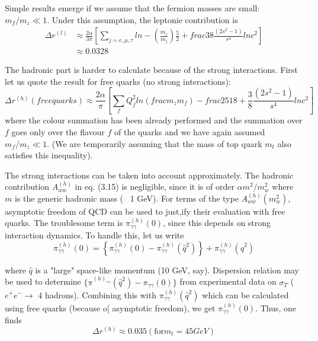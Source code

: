 {Simple results emerge if we assume that the fermion masses are small:
$m_{f}/m_{z}\ll 1$. Under this assumption, the leptonie contribution is
\begin{align*}
\Delta r^{(l)}&\approx \frac{2\alpha}{3\pi} \left[\sum_{j=e,\mu,\tau} ln -\left(\frac{m_{z}}{m_{j}}\right)\frac{5}{2}+frac{3}{8}\frac{(2s^{2}-1)}{s^{4}}ln c^{2} \right]\tag{3.20}\\
&\approx  0.0328\tag{3.21}
\end{align*}

The hadronic part is harder to calculate because of the strong interactions.
First let us quote the result for free quarks (no strong interactions): 
{\fontsize{8}{10}\selectfont\begin{equation*}
\Delta r^{(h)}(free quarks)\approx \frac{2\alpha}{\pi} \left[\sum_{f} Q^{2}_{f} ln \left(frac{m_{z}}{m_{f}} \right) - frac{25}{18} + \frac{3}{8} \frac{(2s^{2}-1)}{s^{4}} ln c^{2} \right]\tag{3.22}
\end{equation*}}
where the colour summation has been already performed and the summation
over $f$ goes only over the flavour $f$ of the quarks and we have again assumed
$m_{f}/m_{z}\ll 1$. (We are temporarily assuming that the mass of top quark $m_{t}$ also
satisfies this inequality).


The strong interactions can be taken into account approximately. The
hadronic contribution $A_{ww}^{(h)}$ in eq. (3.15) is negligible, since it is of order
$\alpha m^{2}/m^{2}_{w}$ where $m$ is the generic hadronic mass (~ 1 GeV). For terms of the
type $A_{ww}^{(h)}(m_{w}^{2})$, asymptotic freedom of QCD can be used to just,ify their evaluation with free quarks. The troublesome term is $\pi^{(h)}_{\gamma \gamma}(0)$, since this depends on
strong interaction dynamics. To handle this, let us write 
\begin{equation*}
\pi^{(h)}_{\gamma\gamma}(0)=\left\{\pi^{(h)}_{\gamma\gamma}(0)- \pi^{(h)}_{\gamma \gamma}(\hat{q}^{2})\right\} +\pi^{(h)}_{\gamma\gamma}(\hat{q}^{2})\tag{3.23}
\end{equation*}

where $\hat{q}$ is a "large" space-like momentum (10 GeV, say). Dispersion relation
may be used to determine $\{ \pi^{(h)_{\gamma\gamma}}(\hat{q}^{2})-\pi_{\gamma\gamma}(0)\}$ from experimental data on $\sigma_{T}$
($e^{+}e^{-} \rightarrow $ 4 hadrons). Combining this with $\pi^{(h)}_{\gamma \gamma}(\hat{q}^{2})$ which can be calculated using
free quarks (because o[ asymptotic freedom), we get $\pi_{\gamma \gamma}^{(h)}(0)$. Thus, one finds 
\begin{equation*}
\Delta r^{(h)} \approx 0.035 (\text{for} m_{t}=45 GeV)\tag{3.24}
\end{equation*}

}
